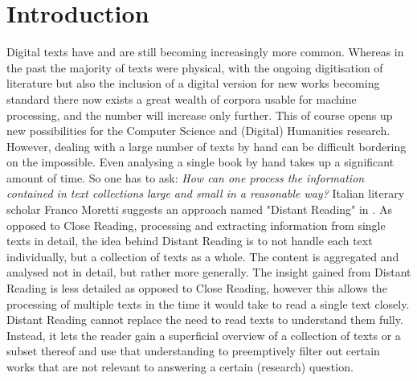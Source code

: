 \chapter{Introduction}
Digital texts have and are still becoming increasingly more common. Whereas in the past the majority of texts were physical, with the ongoing digitisation of literature but also the inclusion of a digital version for new works becoming standard there now exists a great wealth of corpora usable for machine processing, and the number will increase only further. This of course opens up new possibilities for the Computer Science and (Digital) Humanities research. However, dealing with a large number of texts by hand can be difficult bordering on the impossible. Even analysing a single book by hand takes up a significant amount of time. So one has to ask: \textit{How can one process the information contained in text collections large and small in a reasonable way?} Italian literary scholar Franco Moretti suggests an approach named "Distant Reading" in  \cite{moretti16}. As opposed to Close Reading, processing and extracting information from single texts in detail, the idea behind Distant Reading is to not handle each text individually, but a collection of texts as a whole. The content is aggregated and analysed not in detail, but rather more generally. The insight gained from Distant Reading is less detailed as opposed to Close Reading, however this allows the processing of multiple texts in the time it would take to read a single text closely. Distant Reading cannot replace the need to read texts to understand them fully. Instead, it lets the reader gain a superficial overview of a collection of texts or a subset thereof and use that understanding to preemptively filter out certain works that are not relevant to answering a certain (research) question.

